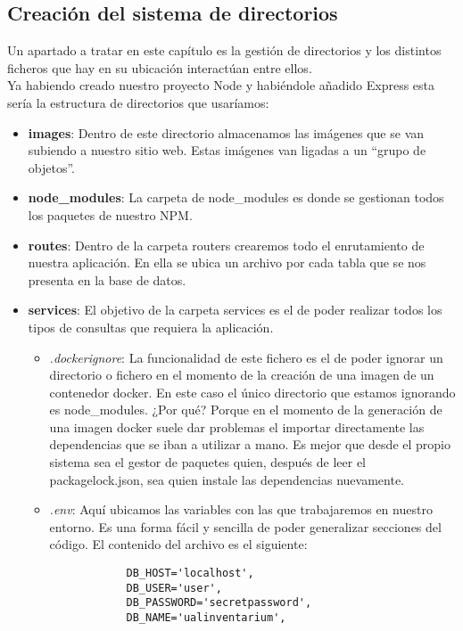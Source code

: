 \subsection{Creación del sistema de directorios}
Un apartado a tratar en este capítulo es la gestión de directorios y los distintos ficheros que hay en su ubicación interactúan entre ellos.
\\Ya habiendo creado nuestro proyecto Node y habiéndole añadido Express esta sería la estructura de directorios que usaríamos:

\begin{itemize}
    \item \textbf{images}: Dentro de este directorio almacenamos las imágenes que se van subiendo a nuestro sitio web. Estas imágenes van ligadas a un ``grupo de objetos''.
    \item \textbf{node\_modules}: La carpeta de node\_modules es donde se gestionan todos los paquetes de nuestro NPM.
    \item \textbf{routes}: Dentro de la carpeta routers crearemos todo el enrutamiento de nuestra aplicación. En ella se ubica un archivo por cada tabla que se nos presenta en la base de datos.
    \item \textbf{services}: El objetivo de la carpeta services es el de poder realizar todos los tipos de consultas que requiera la aplicación.
          \begin{itemize}
              \item \textit{.dockerignore}: La funcionalidad de este fichero es el de poder ignorar un directorio o fichero en el momento de la creación de una imagen de un contenedor docker. En este caso el único directorio que estamos ignorando es node\_modules. ¿Por qué? Porque en el momento de la generación de una imagen docker suele dar problemas el importar directamente las dependencias que se iban a utilizar a mano. Es mejor que desde el propio sistema sea el gestor de paquetes quien, después de leer el package\-lock.json, sea quien instale las dependencias nuevamente.
              \item \textit{.env}: Aquí ubicamos las variables con las que trabajaremos en nuestro entorno. Es una forma fácil y sencilla de poder generalizar secciones del código. El contenido del archivo es el siguiente:
                    \begin{verbatim}
            DB_HOST='localhost',
            DB_USER='user',
            DB_PASSWORD='secretpassword',
            DB_NAME='ualinventarium',
        \end{verbatim}

\end{itemize}
\end{itemize}
